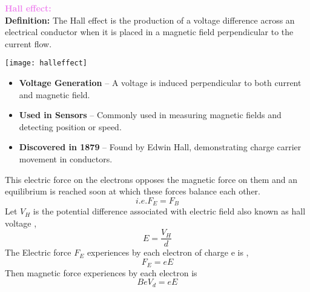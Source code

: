 \documentclass{beamer}
\begin{document}
 
\begin{frame}
       \textcolor{violet}{\textbf{Hall effect:}}\\
    		\textbf{Definition:} The Hall effect is the production of a voltage difference across an electrical conductor when it is placed in a magnetic field perpendicular to the current flow.  \\
          
       
       \begin{center}
       \texttt{[image: halleffect]}
       \end{center}
        \begin{itemize}
       \item  \textbf{Voltage Generation} – A voltage is induced perpendicular to both        current and magnetic field.
 \item \textbf{Used in Sensors} – Commonly used in measuring magnetic fields and detecting position or speed.
 \item \textbf{Discovered in 1879} – Found by Edwin Hall, demonstrating charge carrier movement in conductors.
        \end{itemize}
\end{frame}

\begin{frame}
This electric force on the electrons opposes the magnetic force on them and an
equilibrium is reached soon at which these forces balance each other.\\
\[
i.e. F_E=F_B
\]
Let $V_H$ is the potential difference associated with electric field also known as hall voltage ,\\
\[
E=\frac{V_H}{d}
\]
The Electric force $F_E$ experiences by each electron of charge e is ,\\
\[
F_E=eE
\]
Then magnetic force experiences by each electron is \\
\[
BeV_d= eE
\]


\end{frame}
\end{document}
